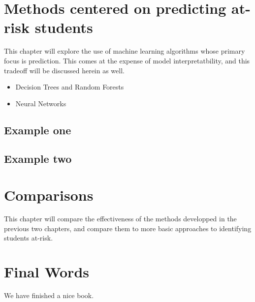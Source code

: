 \documentclass[]{book}
\providecommand{\tightlist}{%
  \setlength{\itemsep}{0pt}\setlength{\parskip}{0pt}}
\theoremstyle{definition}
\theoremstyle{definition}
\theoremstyle{remark}
\begin{document}
\chapter{Methods centered on predicting at-risk
students}\label{methods-centered-on-predicting-at-risk-students}

This chapter will explore the use of machine learning algorithms whose
primary focus is prediction. This comes at the expense of model
interpretatbility, and this tradeoff will be discussed herein as well.

\begin{itemize}
\tightlist
\item
  Decision Trees and Random Forests
\item
  Neural Networks
\end{itemize}

\section{Example one}\label{example-one}

\section{Example two}\label{example-two}

\chapter{Comparisons}\label{comparisons}

This chapter will compare the effectiveness of the methods developped in
the previous two chapters, and compare them to more basic approaches to
identifying students at-risk.

\chapter{Final Words}\label{final-words}

We have finished a nice book.


\end{document}
